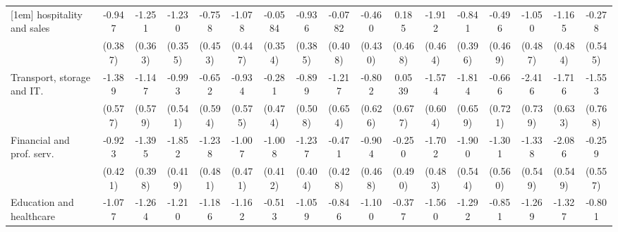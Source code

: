 {\begin{tabular}{l*{16}{c}}
[1em]
hospitality and sales&      -0.947\sym{*}  &      -1.251\sym{***}&      -1.230\sym{***}&      -0.758         &      -1.078\sym{*}  &     -0.0584         &      -0.936\sym{*}  &     -0.0782         &      -0.460         &       0.185         &      -1.912\sym{***}&      -0.841\sym{*}  &      -0.496         &      -1.050\sym{*}  &      -1.165\sym{*}  &      -0.278         \\
                    &     (0.387)         &     (0.363)         &     (0.355)         &     (0.453)         &     (0.447)         &     (0.354)         &     (0.385)         &     (0.408)         &     (0.430)         &     (0.468)         &     (0.464)         &     (0.396)         &     (0.469)         &     (0.487)         &     (0.484)         &     (0.545)         \\
[1em]
Transport, storage and IT.&      -1.389\sym{*}  &      -1.147\sym{*}  &      -0.993         &      -0.652         &      -0.934         &      -0.281         &      -0.899         &      -1.217         &      -0.802         &      0.0539         &      -1.574\sym{**} &      -1.814\sym{**} &      -0.666         &      -2.416\sym{**} &      -1.716\sym{**} &      -1.553\sym{*}  \\
                    &     (0.577)         &     (0.579)         &     (0.541)         &     (0.594)         &     (0.575)         &     (0.474)         &     (0.508)         &     (0.654)         &     (0.626)         &     (0.677)         &     (0.604)         &     (0.659)         &     (0.721)         &     (0.739)         &     (0.633)         &     (0.768)         \\
[1em]
Financial and prof. serv.&      -0.923\sym{*}  &      -1.395\sym{***}&      -1.852\sym{***}&      -1.238\sym{**} &      -1.007\sym{*}  &      -1.008\sym{*}  &      -1.237\sym{**} &      -0.471         &      -0.904         &      -0.250         &      -1.702\sym{***}&      -1.900\sym{***}&      -1.301\sym{*}  &      -1.338\sym{*}  &      -2.086\sym{***}&      -0.259         \\
                    &     (0.421)         &     (0.398)         &     (0.419)         &     (0.481)         &     (0.471)         &     (0.412)         &     (0.404)         &     (0.428)         &     (0.468)         &     (0.490)         &     (0.483)         &     (0.544)         &     (0.560)         &     (0.549)         &     (0.549)         &     (0.557)         \\
[1em]
Education and healthcare&      -1.077\sym{**} &      -1.264\sym{**} &      -1.210\sym{**} &      -1.186\sym{*}  &      -1.162\sym{*}  &      -0.513         &      -1.059\sym{**} &      -0.846         &      -1.100\sym{*}  &      -0.377         &      -1.560\sym{***}&      -1.292\sym{**} &      -0.851         &      -1.269\sym{*}  &      -1.327\sym{**} &      -0.801         \\

\end{tabular}}

